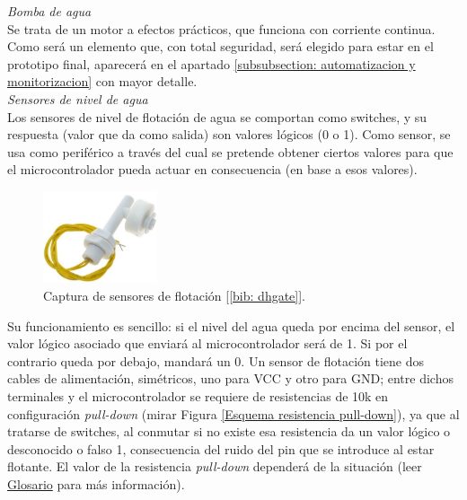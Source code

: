 \documentclass[12pt]{article}
\begin{document}
	\noindent \textit{Bomba de agua} \\
	
	\noindent Se trata de un motor a efectos prácticos, que funciona con corriente continua. Como será un elemento que, con total seguridad, será elegido para estar en el prototipo final, aparecerá en el apartado \ref{subsubsection: automatizacion y monitorizacion} con mayor detalle. \\
	
	\noindent \textit{Sensores de nivel de agua} \\
	
	\noindent Los sensores de nivel de flotación de agua se comportan como switches, y su respuesta (valor que da como salida) son valores lógicos (0 o 1). Como sensor, se usa como periférico a través del cual se pretende obtener ciertos valores para que el microcontrolador pueda actuar en consecuencia (en base a esos valores).\\
	
	\begin{figure}[h!]
			\begin{center}
				\includegraphics[width=0.3\textwidth]{img/sensor_flotacion.png}
				\caption{Captura de sensores de flotación [\ref{bib: dhgate}].}
				\label{Sensor de flotación}
			\end{center}
	\end{figure}
	
	\pagebreak
	
	\noindent Su funcionamiento es sencillo: si el nivel del agua queda por encima del sensor, el valor lógico asociado que enviará al microcontrolador será de 1. Si por el contrario queda por debajo, mandará un 0. Un sensor de flotación tiene dos cables de alimentación, simétricos, uno para VCC y otro para GND; entre dichos terminales y el microcontrolador se requiere de resistencias de 10k en configuración \textit{pull-down} (mirar Figura \ref{Esquema resistencia pull-down}), ya que al tratarse de switches, al conmutar si no existe esa resistencia da un valor lógico o desconocido o falso 1, consecuencia del ruido del pin que se introduce al estar flotante. El valor de la resistencia \textit{pull-down} dependerá de la situación (leer \hyperref[glosario]{Glosario} para más información).\\
	
\end{document}
